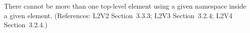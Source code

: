 There cannot be more than one top-level element using a given namespace
inside a given  element.  (References: L2V2 Section~3.3.3;
L2V3 Section~3.2.4; L2V4 Section~3.2.4.)

